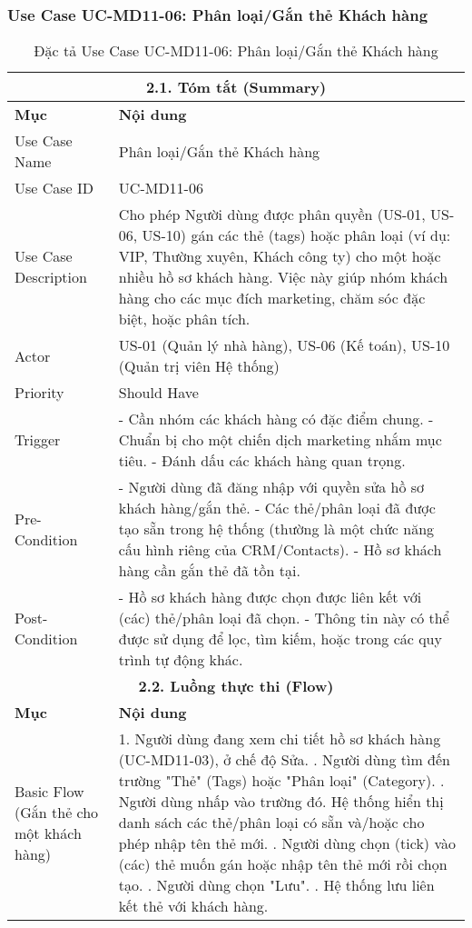 \subsubsection{Use Case UC-MD11-06: Phân loại/Gắn thẻ Khách hàng}
\begin{longtable}{|m{4cm}|p{11cm}|}
\caption{Đặc tả Use Case UC-MD11-06: Phân loại/Gắn thẻ Khách hàng} \label{tab:uc_md11_06_categorize_tag_customer} \\
\hline
\multicolumn{2}{|c|}{\textbf{2.1. Tóm tắt (Summary)}} \\
\hline
\textbf{Mục} & \textbf{Nội dung} \\
\hline
\endhead
\midrule
\endfoot
\bottomrule
\endlastfoot
Use Case Name & Phân loại/Gắn thẻ Khách hàng \\
\hline
Use Case ID & UC-MD11-06 \\
\hline
Use Case Description & Cho phép Người dùng được phân quyền (US-01, US-06, US-10) gán các thẻ (tags) hoặc phân loại (ví dụ: VIP, Thường xuyên, Khách công ty) cho một hoặc nhiều hồ sơ khách hàng. Việc này giúp nhóm khách hàng cho các mục đích marketing, chăm sóc đặc biệt, hoặc phân tích. \\
\hline
Actor & US-01 (Quản lý nhà hàng), US-06 (Kế toán), US-10 (Quản trị viên Hệ thống) \\
\hline
Priority & Should Have \\
\hline
Trigger & - Cần nhóm các khách hàng có đặc điểm chung. \newline - Chuẩn bị cho một chiến dịch marketing nhắm mục tiêu. \newline - Đánh dấu các khách hàng quan trọng. \\
\hline
Pre-Condition & - Người dùng đã đăng nhập với quyền sửa hồ sơ khách hàng/gắn thẻ. \newline - Các thẻ/phân loại đã được tạo sẵn trong hệ thống (thường là một chức năng cấu hình riêng của CRM/Contacts). \newline - Hồ sơ khách hàng cần gắn thẻ đã tồn tại. \\
\hline
Post-Condition & - Hồ sơ khách hàng được chọn được liên kết với (các) thẻ/phân loại đã chọn. \newline - Thông tin này có thể được sử dụng để lọc, tìm kiếm, hoặc trong các quy trình tự động khác. \\
\hline
\multicolumn{2}{|c|}{\textbf{2.2. Luồng thực thi (Flow)}} \\
\hline
\textbf{Mục} & \textbf{Nội dung} \\
\hline
Basic Flow (Gắn thẻ cho một khách hàng) & 1. Người dùng đang xem chi tiết hồ sơ khách hàng (UC-MD11-03), ở chế độ Sửa. \newline 2. Người dùng tìm đến trường "Thẻ" (Tags) hoặc "Phân loại" (Category). \newline 3. Người dùng nhấp vào trường đó. Hệ thống hiển thị danh sách các thẻ/phân loại có sẵn và/hoặc cho phép nhập tên thẻ mới. \newline 4. Người dùng chọn (tick) vào (các) thẻ muốn gán hoặc nhập tên thẻ mới rồi chọn tạo. \newline 5. Người dùng chọn "Lưu". \newline 6. Hệ thống lưu liên kết thẻ với khách hàng. \\

\end{longtable}
